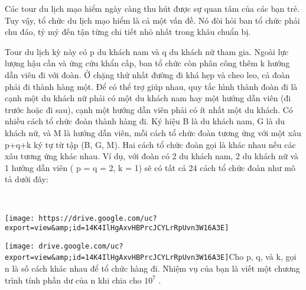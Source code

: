 Các tour du lịch mạo hiểm ngày càng thu hút được sự quan tâm của các bạn trẻ. Tuy vậy, tổ chức du lịch mạo hiểm là cả một vấn đề. Nó đòi hỏi ban tổ chức phải chu đáo, tỷ mỷ đến tận từng chi tiết nhỏ nhất trong khâu chuẩn bị.

Tour du lịch kỳ này có p du khách nam và q du khách nữ tham gia. Ngoài lực lượng hậu cần và ứng cứu khẩn cấp, ban tổ chức còn phân công thêm k hướng dẫn viên đi với đoàn. Ở chặng thứ nhất đường đi khá hẹp và cheo leo, cả đoàn phải đi thành hàng một. Để có thể trợ giúp nhau, quy tắc hình thành đoàn đi là cạnh một du khách nữ phải có một du khách nam hay một hướng dẫn viên (đi trước hoặc đi sau), cạnh một hướng dẫn viên phải có ít nhất một du khách. Có nhiều cách tổ chức đoàn thành hàng đi. Ký hiệu B là du khách nam, G là du khách nữ, và M là hướng dẫn viên, mỗi cách tổ chức đoàn tương ứng với một xâu p+q+k ký tự từ tập (B, G, M). Hai cách tổ chức đoàn gọi là khác nhau nếu các xâu tương ứng khác nhau. Ví dụ, với đoàn có 2 du khách nam, 2 du khách nữ và 1 hướng dẫn viên ( p = q = 2, k = 1) sẽ có tất cả 24 cách tổ chức đoàn như mô tả dưới đây:

 


\texttt{[image: https://drive.google.com/uc?export=view\&amp;id=14K4IlHgAxvHBPrcJCYLrRpUvn3W16A3E]}


\texttt{[image: drive.google.com/uc?export=view\&amp;id=14K4IlHgAxvHBPrcJCYLrRpUvn3W16A3E]}Cho p, q, và k, gọi n là số cách khác nhau để tổ chức hàng đi. Nhiệm vụ của bạn là viết một chương trình tính phần dư của n khi chia cho $10^{7}$ .